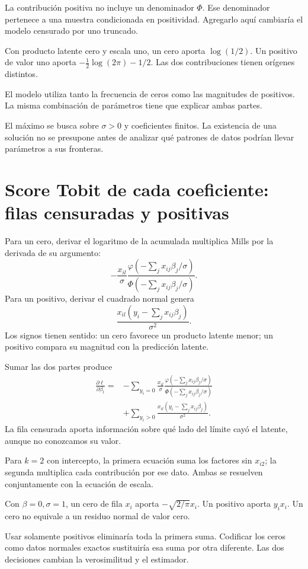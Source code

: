 \documentclass[11pt,a4paper]{article}
\begin{document}
La contribución positiva no incluye
un denominador \(\Phi\).
Ese denominador pertenece a una
muestra condicionada en positividad.
Agregarlo aquí cambiaría el
modelo censurado por uno truncado.

\begin{ejemplo}
Con producto latente cero y escala uno,
un cero aporta \(\log(1/2)\).
Un positivo de valor uno aporta
\(-\tfrac12\log(2\pi)-1/2\).
Las dos contribuciones tienen
orígenes distintos.
\end{ejemplo}
El modelo utiliza tanto la
frecuencia de ceros como
las magnitudes de positivos.
La misma combinación de parámetros
tiene que explicar ambas partes.

El máximo se busca sobre
\(\sigma>0\) y coeficientes finitos.
La existencia de una solución
no se presupone antes de
analizar qué patrones de datos
podrían llevar parámetros a sus fronteras.

\clearpage
\section{Score Tobit de cada coeficiente: filas censuradas y positivas}\label{unidad93}
Para un cero, derivar el
logaritmo de la acumulada
multiplica Mills por la
derivada de su argumento:
\[
-\frac{x_{il}}{\sigma}
\frac{\varphi(-\sum_jx_{ij}\beta_j/\sigma)}
{\Phi(-\sum_jx_{ij}\beta_j/\sigma)}.
\]
Para un positivo, derivar el
cuadrado normal genera
\[
\frac{x_{il}(y_i-\sum_jx_{ij}\beta_j)}{\sigma^2}.
\]
Los signos tienen sentido:
un cero favorece un producto
latente menor; un positivo
compara su magnitud con
la predicción latente.

Sumar las dos partes produce
\[
\begin{aligned}
\frac{\partial\ell}{\partial\beta_l}
={}&-\sum_{y_i=0}\frac{x_{il}}{\sigma}
\frac{\varphi(-\sum_jx_{ij}\beta_j/\sigma)}
{\Phi(-\sum_jx_{ij}\beta_j/\sigma)}\\
&+\sum_{y_i>0}
\frac{x_{il}(y_i-\sum_jx_{ij}\beta_j)}{\sigma^2}.
\end{aligned}
\]
La fila censurada aporta
información sobre qué lado
del límite cayó el latente,
aunque no conozcamos su valor.

Para \(k=2\) con intercepto,
la primera ecuación suma
los factores sin \(x_{i2}\);
la segunda multiplica cada
contribución por ese dato.
Ambas se resuelven conjuntamente
con la ecuación de escala.

\begin{ejemplo}
Con \(\beta=0,\sigma=1\),
un cero de fila \(x_i\)
aporta \(-\sqrt{2/\pi}x_i\).
Un positivo aporta \(y_ix_i\).
Un cero no equivale a
un residuo normal de valor cero.
\end{ejemplo}
Usar solamente positivos
eliminaría toda la primera suma.
Codificar los ceros como
datos normales exactos sustituiría
esa suma por otra diferente.
Las dos decisiones cambian
la verosimilitud y el estimador.
\end{document}
